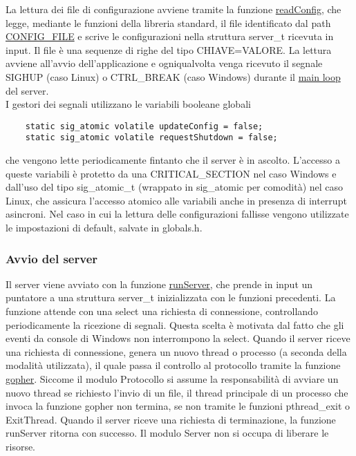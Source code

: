 \documentclass{article}
\begin{document}
La lettura dei file di configurazione avviene tramite la funzione \href{}
{readConfig}, che legge, mediante le funzioni della libreria standard, il file identificato 
dal path \href{}{CONFIG\_FILE} e scrive le configurazioni nella struttura server\_t ricevuta in input.
Il file è una sequenze di righe del tipo CHIAVE=VALORE.
La lettura avviene all'avvio dell'applicazione e ogniqualvolta venga ricevuto il segnale 
SIGHUP (caso Linux) o CTRL\_BREAK (caso Windows) durante il \href{}
{main loop} del server.\\
I gestori dei segnali utilizzano le variabili booleane globali
\begin{lstlisting}
    static sig_atomic volatile updateConfig = false;
    static sig_atomic volatile requestShutdown = false;
\end{lstlisting}
che vengono lette periodicamente fintanto che il server è in ascolto. L'accesso a queste variabili è 
protetto da una CRITICAL\_SECTION nel caso Windows e dall'uso del tipo sig\_atomic\_t (wrappato in sig\_atomic per comodità)
nel caso Linux, che assicura l'accesso atomico alle variabili anche in presenza di interrupt asincroni.
Nel caso in cui la lettura delle configurazioni fallisse vengono utilizzate le 
impostazioni di default, salvate in globals.h.

\subsubsection{Avvio del server}

Il server viene avviato con la funzione \href{}{runServer},
che prende in input un puntatore a una struttura server\_t inizializzata con le funzioni precedenti.
La funzione attende con una select una richiesta di connessione, controllando periodicamente la ricezione
di segnali. Questa scelta è motivata dal fatto che gli eventi da console di Windows non interrompono la select.
Quando il server riceve una richiesta di connessione, genera un nuovo thread o processo (a seconda della modalità
utilizzata), il quale passa il controllo al protocollo tramite la funzione \href{}
{gopher}. Siccome il modulo Protocollo si assume la responsabilità di avviare un nuovo thread se richiesto
l'invio di un file, il thread principale di un processo che invoca la funzione gopher non termina,
se non tramite le funzioni pthread\_exit o ExitThread. Quando il server riceve una richiesta di terminazione, 
la funzione runServer ritorna con successo. Il modulo Server non si occupa di liberare le risorse.
\end{document}
